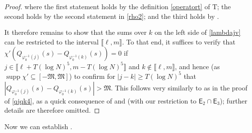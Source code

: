 \documentclass{amsart}
\numberwithin{equation}{section}
\DeclareMathOperator{\supp}{supp}
\theoremstyle{remark}
\theoremstyle{definition}
\begin{document}
\begin{proof}
		\noindent where the first statement holds by the definition \eqref{operatort} of $\bm{\mathrm{T}}$; the second holds by the second statement in \eqref{rho2}; and the third holds by .
		
		It therefore remains to show that the sums over $k$ on the left side of \eqref{lambdajv} can be restricted to the interval $\llbracket \ell, m \rrbracket$. To that end, it suffices to verify that $\chi' ( Q_{\varphi_0^{-1} (j)} (s) - Q_{\varphi_0^{-1} (k)} (s) ) = 0$ if $j \in \llbracket \ell + T(\log N)^5, m - T(\log N)^5 \rrbracket$ and $k \notin \llbracket \ell, m \rrbracket$, and hence (as $\supp \chi' \subseteq [-\mathfrak{M}, \mathfrak{M}]$) to confirm for $|j-k| \ge T(\log N)^5$ that $|Q_{\varphi_0^{-1} (j)} (s) - Q_{\varphi_0^{-1} (k)} (s)| > \mathfrak{M}$. This follows very similarly to as in the proof of \eqref{qjqk4}, as a quick consequence of  and  (with our restriction to $\mathsf{E}_2 \cap \mathsf{E}_3$); further details are therefore omitted.
	\end{proof}
	
	Now we can establish . 
	
\end{document}
